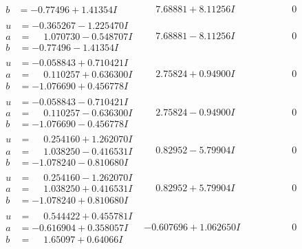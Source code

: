 \documentclass[1p]{elsarticle_modified}
\theoremstyle{definition}
\begin{document}
$$\begin{array}{c|c|c}
\begin{aligned}
b &= -0.77496 + 1.41354 I\end{aligned}
 & \phantom{-}7.68881 + 8.11256 I & \phantom{-0.000000 } 0 \\ \hline\begin{aligned}
u &= -0.365267 - 1.225470 I \\
a &= \phantom{-}1.070730 - 0.548707 I \\
b &= -0.77496 - 1.41354 I\end{aligned}
 & \phantom{-}7.68881 - 8.11256 I & \phantom{-0.000000 } 0 \\ \hline\begin{aligned}
u &= -0.058843 + 0.710421 I \\
a &= \phantom{-}0.110257 + 0.636300 I \\
b &= -1.076690 + 0.456778 I\end{aligned}
 & \phantom{-}2.75824 + 0.94900 I & \phantom{-0.000000 } 0 \\ \hline\begin{aligned}
u &= -0.058843 - 0.710421 I \\
a &= \phantom{-}0.110257 - 0.636300 I \\
b &= -1.076690 - 0.456778 I\end{aligned}
 & \phantom{-}2.75824 - 0.94900 I & \phantom{-0.000000 } 0 \\ \hline\begin{aligned}
u &= \phantom{-}0.254160 + 1.262070 I \\
a &= \phantom{-}1.038250 - 0.416531 I \\
b &= -1.078240 - 0.810680 I\end{aligned}
 & \phantom{-}0.82952 - 5.79904 I & \phantom{-0.000000 } 0 \\ \hline\begin{aligned}
u &= \phantom{-}0.254160 - 1.262070 I \\
a &= \phantom{-}1.038250 + 0.416531 I \\
b &= -1.078240 + 0.810680 I\end{aligned}
 & \phantom{-}0.82952 + 5.79904 I & \phantom{-0.000000 } 0 \\ \hline\begin{aligned}
u &= \phantom{-}0.544422 + 0.455781 I \\
a &= -0.616904 + 0.358057 I \\
b &= \phantom{-}1.65097 + 0.64066 I\end{aligned}
 & -0.607696 + 1.062650 I & \phantom{-0.000000 } 0 \\ \hline\begin{aligned}

\end{aligned}
\end{array}$$
\end{document}
